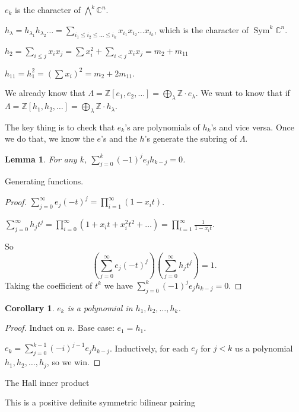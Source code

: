 \documentclass{report}
\newcommand{\C}{\mathbb{C}}
\newcommand{\Z}{\mathbb{Z}}
\def \Sym {\operatorname{Sym}}
\newtheorem{corollary}{Corollary}[section]
\newtheorem{lemma}{Lemma}[section]
\theoremstyle{definition}
\theoremstyle{remark}
\numberwithin{equation}{section}
\begin{document}
$e_k$ is the character of $\bigwedge^k \C^n$.

$h_\lambda = h_{\lambda_1}h_{\lambda_2}\ldots = \sum_{i_1 \leq i_2 \leq \ldots \leq i_k}x_{i_1}x_{i_2}\ldots x_{i_k}$, which is the character of $\Sym^k \C^n$.

$h_2 = \sum_{i \leq j}x_i x_j = \sum x_i^2 + \sum_{i < j} x_i x_j = m_2 + m_{11}$

$h_{11} = h_1^2 = \left(\sum x_i\right)^2 = m_2 + 2m_{11}$.

We already know that $\Lambda = \Z[e_1, e_2, \ldots] = \bigoplus_\lambda \Z \cdot e_\lambda$. We want to know that if $\Lambda = \Z[h_1, h_2, \ldots] = \bigoplus_\lambda \Z \cdot h_\lambda$.

The key thing is to check that $e_k$'s are polynomials of $h_k$'s and vice versa. Once we do that, we know the $e$'s and the $h$'s generate the subring of $\Lambda$.

\begin{lemma}
    For any $k$, $\sum_{j=0}^k (-1)^je_jh_{k-j} = 0$.
\end{lemma}
Generating functions.
\begin{proof}
    $\sum_{j=0}^\infty e_j (-t)^j = \prod_{i=1}^\infty (1 - x_i t)$.

    $\sum_{j=0}^\infty h_j t^j = \prod_{i=0}^\infty (1 + x_i t + x_i^2 t^2 + \ldots) = \prod_{i=1}^\infty \frac{1}{1 - x_it}$.

    So \[
        \left(\sum_{j=0}^\infty e_j (-t)^j\right)\left(\sum_{j=0}^\infty h_j t^j\right) = 1.
    \]
    Taking the coefficient of $t^k$ we have $\sum_{j=0}^k (-1)^je_jh_{k-j} = 0$.
\end{proof}

\begin{corollary}
    $e_k$ is a polynomial in $h_1, h_2, \ldots, h_k$.
\end{corollary}
\begin{proof}
    Induct on $n$. Base case: $e_1 = h_1$.

    $e_k = \sum_{j=0}^{k-1}(-i)^{j-1}e_j h_{k-j}$. Inductively, for each $e_j$ for $j < k$ us a polynomial $h_1, h_2, \ldots, h_j$, so we win.
\end{proof}

The Hall inner product

This is a positive definite symmetric bilinear pairing
\end{document}
